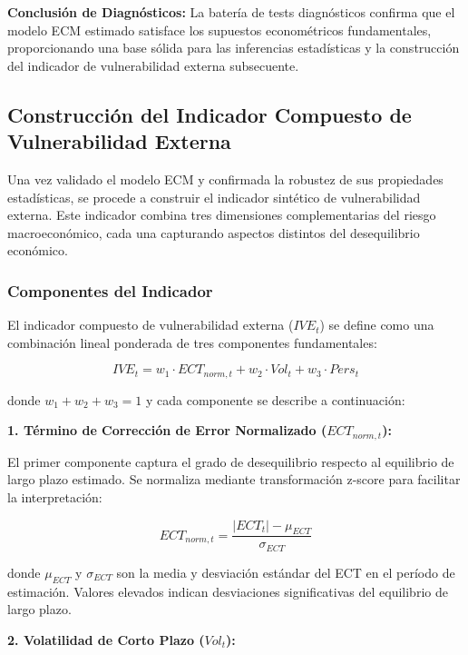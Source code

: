 \documentclass[3p,11pt]{elsarticle}
\begin{document}
\textbf{Conclusión de Diagnósticos:} La batería de tests diagnósticos confirma que el modelo ECM estimado satisface los supuestos econométricos fundamentales, proporcionando una base sólida para las inferencias estadísticas y la construcción del indicador de vulnerabilidad externa subsecuente.

\subsection{Construcción del Indicador Compuesto de Vulnerabilidad Externa}

Una vez validado el modelo ECM y confirmada la robustez de sus propiedades estadísticas, se procede a construir el indicador sintético de vulnerabilidad externa. Este indicador combina tres dimensiones complementarias del riesgo macroeconómico, cada una capturando aspectos distintos del desequilibrio económico.

\subsubsection{Componentes del Indicador}

El indicador compuesto de vulnerabilidad externa ($IVE_t$) se define como una combinación lineal ponderada de tres componentes fundamentales:

\begin{equation}
IVE_t = w_1 \cdot ECT_{norm,t} + w_2 \cdot Vol_{t} + w_3 \cdot Pers_t
\label{eq:indicador_compuesto}
\end{equation}

donde $w_1 + w_2 + w_3 = 1$ y cada componente se describe a continuación:

\textbf{1. Término de Corrección de Error Normalizado ($ECT_{norm,t}$):}

El primer componente captura el grado de desequilibrio respecto al equilibrio de largo plazo estimado. Se normaliza mediante transformación z-score para facilitar la interpretación:

\begin{equation}
ECT_{norm,t} = \frac{|ECT_t| - \mu_{ECT}}{\sigma_{ECT}}
\label{eq:ect_normalizado}
\end{equation}

donde $\mu_{ECT}$ y $\sigma_{ECT}$ son la media y desviación estándar del ECT en el período de estimación. Valores elevados indican desviaciones significativas del equilibrio de largo plazo.

\textbf{2. Volatilidad de Corto Plazo ($Vol_t$):}
\end{document}
